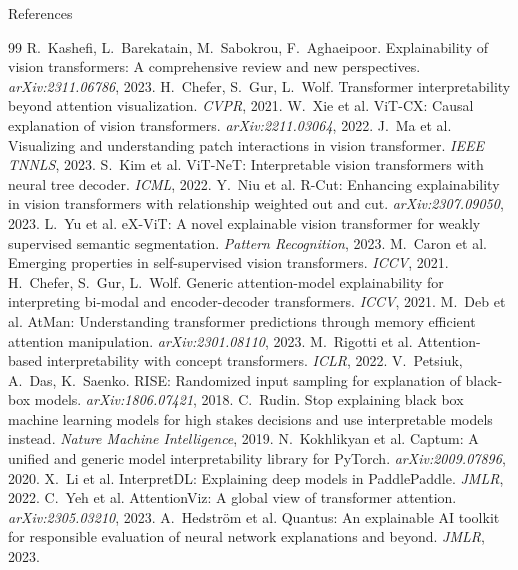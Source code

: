 \documentclass[10pt]{beamer}
\begin{document}
\begin{frame}[allowframebreaks]{References}
\tiny
\begin{thebibliography}{99}
\bibitem{} R.~Kashefi, L.~Barekatain, M.~Sabokrou, F.~Aghaeipoor. Explainability of vision transformers: A comprehensive review and new perspectives. \emph{arXiv:2311.06786}, 2023.
\bibitem{} H.~Chefer, S.~Gur, L.~Wolf. Transformer interpretability beyond attention visualization. \emph{CVPR}, 2021.
\bibitem{} W.~Xie et al. ViT-CX: Causal explanation of vision transformers. \emph{arXiv:2211.03064}, 2022.
\bibitem{} J.~Ma et al. Visualizing and understanding patch interactions in vision transformer. \emph{IEEE TNNLS}, 2023.
\bibitem{} S.~Kim et al. ViT-NeT: Interpretable vision transformers with neural tree decoder. \emph{ICML}, 2022.
\bibitem{} Y.~Niu et al. R-Cut: Enhancing explainability in vision transformers with relationship weighted out and cut. \emph{arXiv:2307.09050}, 2023.
\bibitem{} L.~Yu et al. eX-ViT: A novel explainable vision transformer for weakly supervised semantic segmentation. \emph{Pattern Recognition}, 2023.
\bibitem{} M.~Caron et al. Emerging properties in self-supervised vision transformers. \emph{ICCV}, 2021.
\bibitem{} H.~Chefer, S.~Gur, L.~Wolf. Generic attention-model explainability for interpreting bi-modal and encoder-decoder transformers. \emph{ICCV}, 2021.
\bibitem{} M.~Deb et al. AtMan: Understanding transformer predictions through memory efficient attention manipulation. \emph{arXiv:2301.08110}, 2023.
\bibitem{} M.~Rigotti et al. Attention-based interpretability with concept transformers. \emph{ICLR}, 2022.
\bibitem{} V.~Petsiuk, A.~Das, K.~Saenko. RISE: Randomized input sampling for explanation of black-box models. \emph{arXiv:1806.07421}, 2018.
\bibitem{} C.~Rudin. Stop explaining black box machine learning models for high stakes decisions and use interpretable models instead. \emph{Nature Machine Intelligence}, 2019.
\bibitem{} N.~Kokhlikyan et al. Captum: A unified and generic model interpretability library for PyTorch. \emph{arXiv:2009.07896}, 2020.
\bibitem{} X.~Li et al. InterpretDL: Explaining deep models in PaddlePaddle. \emph{JMLR}, 2022.
\bibitem{} C.~Yeh et al. AttentionViz: A global view of transformer attention. \emph{arXiv:2305.03210}, 2023.
\bibitem{} A.~Hedstr\"om et al. Quantus: An explainable AI toolkit for responsible evaluation of neural network explanations and beyond. \emph{JMLR}, 2023.
\end{thebibliography}
\end{frame}

\begin{frame}[plain]
\end{frame}
\end{document}
